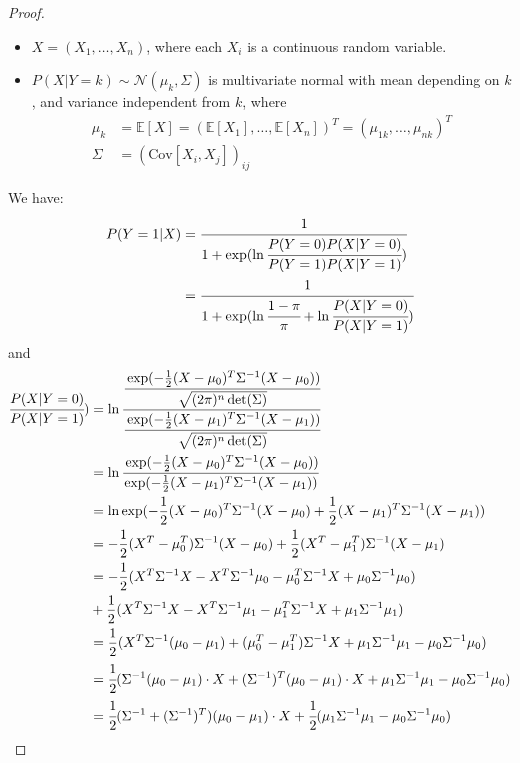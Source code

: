 \documentclass[12pt]{article}
\newcommand{\E}{\mathbb{E}}
\newcommand\inv[1]{#1^{-1}}
\begin{document}
\begin{proof}
\begin{itemize}
  \item
    $X = (X_1, \dots, X_n)$, where each $X_i$ is a continuous random variable.
  \item
    $P(X | Y=k) \sim \mathcal{N}(\mu_{k}, \Sigma)$ is multivariate normal with mean depending on $k$, and variance independent from $k$, where
    \begin{align*}
      \mu_k
      &= \E[X] = (\E[X_1], \dots, \E[X_n])^T = (\mu_{1k}, \dots, \mu_{nk})^T \\
      \Sigma
      &= (\text{Cov}[X_i, X_j])_{ij}
    \end{align*}
  \end{itemize}
  We have:
  \begin{align*}
    P(Y=1|X)
    &= \cfrac{1}{1+\exp(\ln\cfrac{P(Y=0)P(X|Y=0)}{P(Y=1)P(X|Y=1)})} \\
    &= \cfrac{1}{1+\exp(\ln\cfrac{1-\pi}{\pi} + \ln\cfrac{P(X|Y=0)}{P(X|Y=1)})} 
  \end{align*}
  and
  \begin{align*}
    \cfrac{P(X|Y=0)}{P(X|Y=1)})
    &= \ln\cfrac{\cfrac{\exp(-\frac{1}{2}(X-\mu_0)^T\Sigma^{-1}(X-\mu_0))}{\sqrt{(2\pi)^n\det(\Sigma)}}}{\cfrac{\exp(-\frac{1}{2}(X-\mu_1)^T\Sigma^{-1}(X-\mu_1))}{\sqrt{(2\pi)^n\det(\Sigma)}}} \\
    &= \ln\cfrac{\exp(-\frac{1}{2}(X-\mu_0)^T\Sigma^{-1}(X-\mu_0))}{\exp(-\frac{1}{2}(X-\mu_1)^T\Sigma^{-1}(X-\mu_1))} \\
    &= \ln\exp(-\frac{1}{2}(X-\mu_0)^T\Sigma^{-1}(X-\mu_0) + \frac{1}{2}(X-\mu_1)^T\Sigma^{-1}(X-\mu_1)) \\
    &= -\frac{1}{2}(X^T-\mu_0^T)\Sigma^{-1}(X-\mu_0) + \frac{1}{2}(X^T-\mu_1^T)\Sigma^{-1}(X-\mu_1)\\
    &= -\frac{1}{2}(X^T\Sigma^{-1}X -X^T\inv{\Sigma}\mu_{0} - \mu_{0}^T\inv{\Sigma}X + \mu_{0}\inv{\Sigma}\mu_{0}) \\
    &+ \frac{1}{2}(X^T\Sigma^{-1}X -X^T\inv{\Sigma}\mu_{1} - \mu_{1}^T\inv{\Sigma}X + \mu_{1}\inv{\Sigma}\mu_{1}) \\
    &= \frac{1}{2}(X^T\inv{\Sigma}(\mu_{0} -\mu_{1}) + (\mu_{0}^T - \mu_{1}^T)\inv{\Sigma}X + \mu_{1}\inv{\Sigma}\mu_{1} - \mu_{0}\inv{\Sigma}\mu_{0}) \\
    &= \cfrac{1}{2}( \Sigma^{-1}(\mu_0 - \mu_1) \cdot X + (\Sigma^{-1})^T(\mu_0 - \mu_1) \cdot X + \mu_{1}\inv{\Sigma}\mu_{1} - \mu_{0}\inv{\Sigma}\mu_{0})\\
    &= \cfrac{1}{2}(\Sigma^{-1} + (\Sigma^{-1})^T)(\mu_0 - \mu_1)\cdot X +\cfrac{1}{2}(\mu_{1}\inv{\Sigma}\mu_{1} - \mu_{0}\inv{\Sigma}\mu_{0}) \\

\end{align*}
\end{proof}
\end{document}
